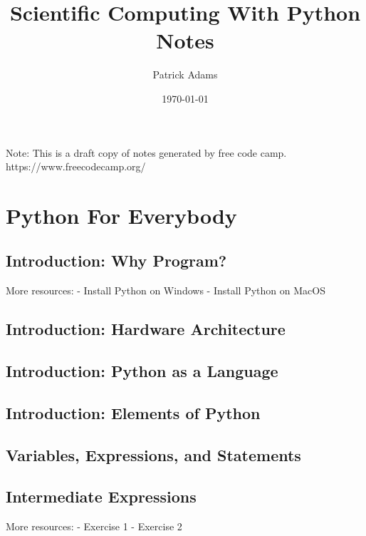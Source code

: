 \documentclass{article}%
\title{Scientific Computing With Python Notes}%
\author{Patrick Adams}%
\date{\today}%
\begin{document}
%
\normalsize%
\maketitle%
\newpage%
Note: This is a draft copy of notes generated by free code camp.\newline%
%
https://www.freecodecamp.org/%
\newpage%
\tableofcontents%
\section{Python For Everybody}%
\label{sec:PythonForEverybody}%
\subsection{Introduction: Why Program?}%
\label{subsec:IntroductionWhyProgram?}%
More resources:\newline%
{-} Install Python on Windows\newline%
{-} Install Python on MacOS\newline%

%
\subsection{Introduction: Hardware Architecture}%
\label{subsec:IntroductionHardwareArchitecture}%

%
\subsection{Introduction: Python as a Language}%
\label{subsec:IntroductionPythonasaLanguage}%

%
\subsection{Introduction: Elements of Python}%
\label{subsec:IntroductionElementsofPython}%

%
\subsection{Variables, Expressions, and Statements}%
\label{subsec:Variables,Expressions,andStatements}%

%
\subsection{Intermediate Expressions}%
\label{subsec:IntermediateExpressions}%
More resources:\newline%
{-} Exercise 1\newline%
{-} Exercise 2\newline%
\end{document}

